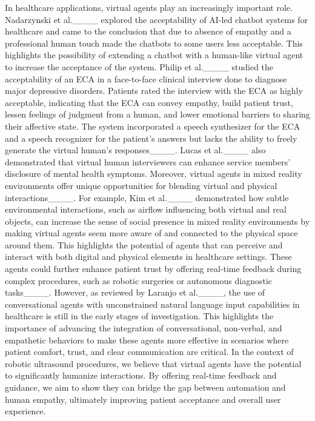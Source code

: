  In healthcare applications, virtual agents play an increasingly important role. Nadarzynski et al.____ explored the acceptability of AI-led chatbot systems for healthcare and came to the conclusion that due to absence of empathy and a professional human touch made the chatbots to some users less acceptable. This highlights the possibility of extending a chatbot with a human-like virtual agent to increase the acceptance of the system. Philip et al.____ studied the acceptability of an ECA in a face-to-face clinical interview done to diagnose major depressive disorders. Patients rated the interview with the ECA as highly acceptable, indicating that the ECA can convey empathy, build patient trust, lessen feelings of judgment from a human, and lower emotional barriers to sharing their affective state. The system incorporated a speech synthesizer for the ECA and a speech recognizer for the patient's answers but lacks the ability to freely generate the virtual human's responses____. Lucas et al.____ also demonstrated that virtual human interviewers can enhance service members' disclosure of mental health symptoms. Moreover, virtual agents in mixed reality environments offer unique opportunities for blending virtual and physical interactions____. For example, Kim et al.____ demonstrated how subtle environmental interactions, such as airflow influencing both virtual and real objects, can increase the sense of social presence in mixed reality environments by making virtual agents seem more aware of and connected to the physical space around them. This highlights the potential of agents that can perceive and interact with both digital and physical elements in healthcare settings. These agents could further enhance patient trust by offering real-time feedback during complex procedures, such as robotic surgeries or autonomous diagnostic tasks____.
However, as reviewed by Laranjo et al.____, the use of conversational agents  with unconstrained natural language input capabilities in healthcare is still in the early stages of investigation. This highlights the importance of advancing the integration of conversational, non-verbal, and empathetic behaviors to make these agents more effective in scenarios where patient comfort, trust, and clear communication are critical. In the context of robotic ultrasound procedures, we believe that virtual agents have the potential to significantly humanize interactions. By offering real-time feedback and guidance, we aim to show they can bridge the gap between automation and human empathy, ultimately improving patient acceptance and overall user experience.



